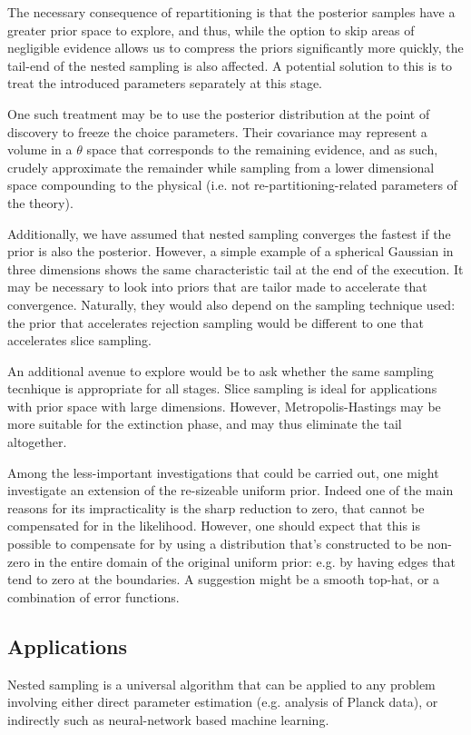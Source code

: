 \documentclass[usenatbib]{mnras}
\begin{document}
The necessary consequence of repartitioning is that the posterior
samples have a greater prior space to explore, and thus, while the
option to skip areas of negligible evidence allows us to compress
the priors significantly more quickly, the tail-end of the nested
sampling is also affected. A potential solution to this is to treat
the introduced parameters separately at this stage.

One such treatment may be to use the posterior distribution at the
point of discovery to freeze the choice parameters. Their
covariance may represent a volume in a \(\theta\) space that
corresponds to the remaining evidence, and as such, crudely
approximate the remainder while sampling from a lower dimensional
space compounding to the physical (i.e. not re-partitioning-related
parameters of the theory).

Additionally, we have assumed that nested sampling converges the
fastest if the prior is also the posterior. However, a simple
example of a spherical Gaussian in three dimensions shows the same
characteristic tail at the end of the execution. It may be
necessary to look into priors that are tailor made to accelerate
that convergence. Naturally, they would also depend on the sampling
technique used: the prior that accelerates rejection sampling would
be different to one that accelerates slice sampling.

An additional avenue to explore would be to ask whether the same
sampling tecnhique is appropriate for all stages. Slice sampling is
ideal for applications with prior space with large
dimensions. However, Metropolis-Hastings may be more suitable for
the extinction phase, and may thus eliminate the tail altogether.

Among the less-important investigations that could be carried out,
one might investigate an extension of the re-sizeable uniform
prior. Indeed one of the main reasons for its impracticality is the
sharp reduction to zero, that cannot be compensated for in the
likelihood. However, one should expect that this is possible to
compensate for by using a distribution that's constructed to be
non-zero in the entire domain of the original uniform prior:
e.g. by having edges that tend to zero at the boundaries. A
suggestion might be a smooth top-hat, or a combination of error
functions.

\subsection{Applications}
\label{sec:org30f861c}
Nested sampling is a universal algorithm that can be applied to any
problem involving either direct parameter estimation (e.g. analysis
of Planck data), or indirectly such as neural-network based machine
learning.
\end{document}
